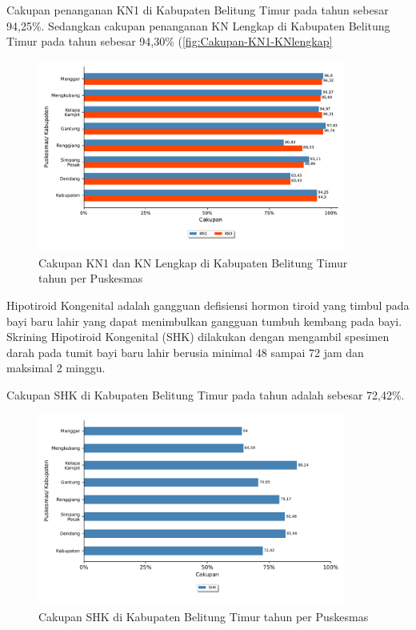 Cakupan penanganan KN1 di Kabupaten Belitung Timur pada tahun \tP sebesar 94,25\%.
Sedangkan cakupan penanganan KN Lengkap di Kabupaten Belitung Timur pada tahun \tP sebesar 94,30\% (\autoref{fig:Cakupan-KN1-KNlengkap}


\begin{figure}[H]
    \centering
    \includegraphics[width=0.9\textwidth]{bab_05/bab_05_14_KN1KN3}
    \caption{Cakupan KN1 dan KN Lengkap di Kabupaten Belitung Timur tahun \tP per Puskesmas}
    \label{fig:Cakupan-KN1-KNlengkap}
\end{figure}


Hipotiroid Kongenital adalah gangguan defisiensi hormon tiroid yang timbul pada bayi baru lahir yang dapat menimbulkan gangguan tumbuh kembang pada bayi.
Skrining Hipotiroid Kongenital (SHK) dilakukan dengan mengambil spesimen darah pada tumit bayi baru lahir berusia minimal 48 sampai 72 jam dan maksimal 2 minggu.

Cakupan SHK di Kabupaten Belitung Timur pada tahun \tP adalah sebesar 72,42\%.

\begin{figure}[H]
	\centering
	\includegraphics[width=0.9\textwidth]{bab_05/bab_05_14c_SHK}
	\caption{Cakupan SHK di Kabupaten Belitung Timur tahun \tP per Puskesmas}
	\label{fig:Cakupan-SHK}
\end{figure}

